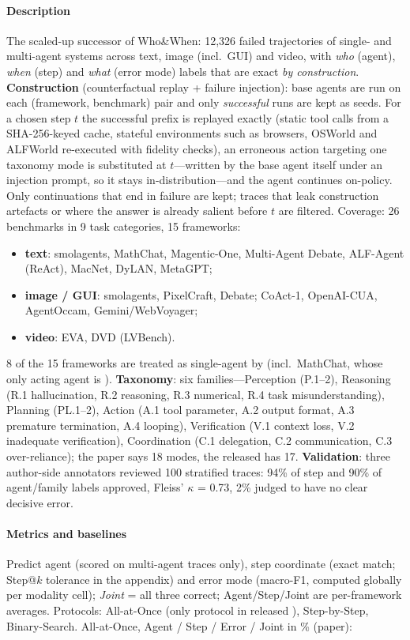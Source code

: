\paragraph{Description} The scaled-up successor of Who\&When: 12,326 failed trajectories of single- and multi-agent systems across text, image (incl.\ GUI) and video, with \emph{who} (agent), \emph{when} (step) and \emph{what} (error mode) labels that are exact \emph{by construction}. \textbf{Construction} (counterfactual replay + failure injection): base agents are run on each (framework, benchmark) pair and only \emph{successful} runs are kept as seeds. For a chosen step $t$ the successful prefix is replayed exactly (static tool calls from a SHA-256-keyed cache, stateful environments such as browsers, OSWorld and ALFWorld re-executed with fidelity checks), an erroneous action targeting one taxonomy mode is substituted at $t$---written by the base agent itself under an injection prompt, so it stays in-distribution---and the agent continues on-policy. Only continuations that end in failure are kept; traces that leak construction artefacts or where the answer is already salient before $t$ are filtered. Coverage: 26 benchmarks in 9 task categories, 15 frameworks:
\begin{itemize}
\item \textbf{text}: smolagents, MathChat, Magentic-One, Multi-Agent Debate, ALF-Agent (ReAct), MacNet, DyLAN, MetaGPT;
\item \textbf{image / GUI}: smolagents, PixelCraft, Debate; CoAct-1, OpenAI-CUA, AgentOccam, Gemini/WebVoyager;
\item \textbf{video}: EVA, DVD (LVBench).
\end{itemize}
8 of the 15 frameworks are treated as single-agent by  (incl.\ MathChat, whose only acting agent is ). \textbf{Taxonomy}: six families---Perception (P.1--2), Reasoning (R.1 hallucination, R.2 reasoning, R.3 numerical, R.4 task misunderstanding), Planning (PL.1--2), Action (A.1 tool parameter, A.2 output format, A.3 premature termination, A.4 looping), Verification (V.1 context loss, V.2 inadequate verification), Coordination (C.1 delegation, C.2 communication, C.3 over-reliance); the paper says 18 modes, the released  has 17. \textbf{Validation}: three author-side annotators reviewed 100 stratified traces: 94\% of step and 90\% of agent/family labels approved, Fleiss' $\kappa$ = 0.73, 2\% judged to have no clear decisive error.

\paragraph{Metrics and baselines} Predict agent (scored on multi-agent traces only), step coordinate (exact match; Step@$k$ tolerance in the appendix) and error mode (macro-F1, computed globally per modality cell); \emph{Joint} = all three correct; Agent/Step/Joint are per-framework averages. Protocols: All-at-Once (only protocol in released ), Step-by-Step, Binary-Search. All-at-Once, Agent / Step / Error / Joint in \% (paper):

